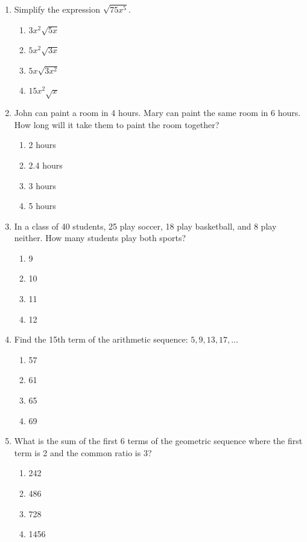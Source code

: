 \documentclass[12pt]{scrartcl}
\begin{document}
\begin{enumerate}
    \item Simplify the expression $\sqrt{75x^5}$.
    \begin{enumerate}
        \item $3x^2\sqrt{5x}$
        \item $5x^2\sqrt{3x}$
        \item $5x\sqrt{3x^2}$
        \item $15x^2\sqrt{x}$
    \end{enumerate}

    \item John can paint a room in 4 hours. Mary can paint the same room in 6 hours. How long will it take them to paint the room together?
    \begin{enumerate}
        \item 2 hours
        \item 2.4 hours
        \item 3 hours
        \item 5 hours
    \end{enumerate}

    \item In a class of 40 students, 25 play soccer, 18 play basketball, and 8 play neither. How many students play both sports?
    \begin{enumerate}
        \item 9
        \item 10
        \item 11
        \item 12
    \end{enumerate}

    \item Find the 15th term of the arithmetic sequence: $5, 9, 13, 17, \dots$
    \begin{enumerate}
        \item 57
        \item 61
        \item 65
        \item 69
    \end{enumerate}

    \item What is the sum of the first 6 terms of the geometric sequence where the first term is 2 and the common ratio is 3?
    \begin{enumerate}
        \item 242
        \item 486
        \item 728
        \item 1456
    \end{enumerate}


\end{enumerate}
\end{document}
